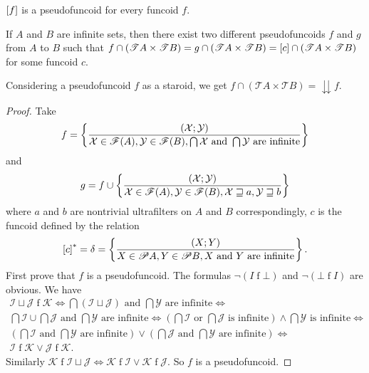 \begin{obvious}
$\mathrel{\left[f\right]}$ is a pseudofuncoid for every funcoid $f$.\end{obvious}
\begin{example}
If $A$ and $B$ are infinite sets, then there exist two different
pseudofuncoids $f$ and $g$ from $A$ to $B$ such that $f\cap(\mathscr{T}A\times\mathscr{T}B)=g\cap(\mathscr{T}A\times\mathscr{T}B)=\mathord{\mathrel{\left[c\right]}}\cap(\mathscr{T}A\times\mathscr{T}B)$
for some funcoid $c$.\end{example}
\begin{rem}
Considering a pseudofuncoid $f$ as a staroid, we get $f\cap(\mathscr{T}A\times\mathscr{T}B)=\downdownarrows f$.\end{rem}
\begin{proof}
Take 
\[
f=\left\{ \frac{(\mathcal{X};\mathcal{Y})}{\mathcal{X}\in\mathscr{F}(A),\mathcal{Y}\in\mathscr{F}(B),\bigcap\mathcal{X}\text{ and }\bigcap\mathcal{Y}\text{ are infinite}}\right\}
\]
and 
\[
g=f\cup\left\{ \frac{(\mathcal{X};\mathcal{Y})}{\mathcal{X}\in\mathscr{F}(A),\mathcal{Y}\in\mathscr{F}(B),\mathcal{X}\sqsupseteq a,\mathcal{Y}\sqsupseteq b}\right\}
\]
where $a$ and $b$ are nontrivial ultrafilters on $A$ and $B$ correspondingly,
$c$ is the funcoid defined by the relation 
\[
\mathord{\mathrel{\left[c\right]^{\ast}}}=\delta=\left\{ \frac{(X;Y)}{X\in\mathscr{P} A,Y\in\mathscr{P} B,X\text{ and }Y\text{ are infinite}}\right\}.
\]
First prove that $f$ is a pseudofuncoid. The formulas $\neg\left(I\mathrel{f}\bot\right)$
and $\neg\left(\bot\mathrel{f}I\right)$ are obvious. We have 
\begin{multline*}
\mathcal{I}\sqcup\mathcal{J}\mathrel{f}\mathcal{K}\Leftrightarrow\bigcap(\mathcal{I}\sqcup\mathcal{J})\text{ and }\bigcap\mathcal{Y}\text{ are infinite}\Leftrightarrow\\
\bigcap\mathcal{I}\cup\bigcap\mathcal{J}\text{ and }\bigcap\mathcal{Y}\text{ are infinite}\Leftrightarrow\left(\bigcap\mathcal{I}\text{ or }\bigcap\mathcal{J}\text{ is infinite}\right)\wedge\bigcap\mathcal{Y}\text{ is infinite}\Leftrightarrow\\
\left(\bigcap\mathcal{I}\text{ and }\bigcap\mathcal{Y}\text{ are infinite}\right)\vee\left(\bigcap\mathcal{J}\text{ and }\bigcap\mathcal{Y}\text{ are infinite}\right)\Leftrightarrow\\
\mathcal{I}\mathrel{f}\mathcal{K}\vee\mathcal{J}\mathrel{f}\mathcal{K}.
\end{multline*}
Similarly $\mathcal{K}\mathrel{f}\mathcal{I}\sqcup\mathcal{J}\Leftrightarrow\mathcal{K}\mathrel{f}\mathcal{I}\vee\mathcal{K}\mathrel{f}\mathcal{J}$.
So $f$ is a pseudofuncoid.


\end{proof}
